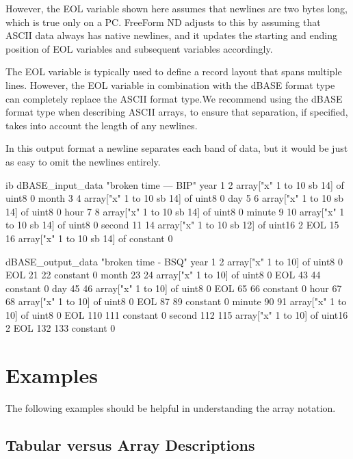 However, the EOL variable shown here assumes that newlines are two
bytes long, which is true only on a PC. FreeForm ND adjusts to this by
assuming that ASCII data always has native newlines, and it updates
the starting and ending position of EOL variables and subsequent
variables accordingly.

The EOL variable is typically used to define a record layout that
spans multiple lines. However, the EOL variable in combination with
the dBASE format type can completely replace the ASCII format type.We
recommend using the dBASE format type when describing ASCII arrays, to
ensure that separation, if specified, takes into account the length of
any newlines.

In this output format a newline separates each band of data, but it
would be just as easy to omit the newlines entirely.

\begin{vcode}{ib}
dBASE_input_data "broken time --- BIP" 
year 1 2 array["x" 1 to 10 sb 14] of uint8 0 
month 3 4 array["x" 1 to 10 sb 14] of uint8 0 
day 5 6 array["x" 1 to 10 sb 14] of uint8 0 
hour 7 8 array["x" 1 to 10 sb 14] of uint8 0 
minute 9 10 array["x" 1 to 10 sb 14] of uint8 0 
second 11 14 array["x" 1 to 10 sb 12] of uint16 2 
EOL 15 16 array["x" 1 to 10 sb 14] of constant 0 

dBASE_output_data "broken time - BSQ" 
year 1 2 array["x" 1 to 10] of uint8 0 
EOL 21 22 constant 0 
month 23 24 array["x" 1 to 10] of uint8 0 
EOL 43 44 constant 0 
day 45 46 array["x" 1 to 10] of uint8 0 
EOL 65 66 constant 0 
hour 67 68 array["x" 1 to 10] of uint8 0 
EOL 87 89 constant 0 
minute 90 91 array["x" 1 to 10] of uint8 0 
EOL 110 111 constant 0 
second 112 115 array["x" 1 to 10] of uint16 2 
EOL 132 133 constant 0  
\end{vcode}


\section{Examples }
\label{ff,fmtexamples}

The following examples should be helpful in understanding the array
notation.

\subsection{Tabular versus Array Descriptions}

